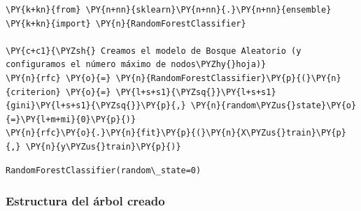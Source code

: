     \begin{tcolorbox}[breakable, size=fbox, boxrule=1pt, pad at break*=1mm,colback=cellbackground, colframe=cellborder]
\begin{Verbatim}[commandchars=\\\{\}]
\PY{k+kn}{from} \PY{n+nn}{sklearn}\PY{n+nn}{.}\PY{n+nn}{ensemble} \PY{k+kn}{import} \PY{n}{RandomForestClassifier}

\PY{c+c1}{\PYZsh{} Creamos el modelo de Bosque Aleatorio (y configuramos el número máximo de nodos\PYZhy{}hoja)}
\PY{n}{rfc} \PY{o}{=} \PY{n}{RandomForestClassifier}\PY{p}{(}\PY{n}{criterion} \PY{o}{=} \PY{l+s+s1}{\PYZsq{}}\PY{l+s+s1}{gini}\PY{l+s+s1}{\PYZsq{}}\PY{p}{,} \PY{n}{random\PYZus{}state}\PY{o}{=}\PY{l+m+mi}{0}\PY{p}{)}
\PY{n}{rfc}\PY{o}{.}\PY{n}{fit}\PY{p}{(}\PY{n}{X\PYZus{}train}\PY{p}{,} \PY{n}{y\PYZus{}train}\PY{p}{)}
\end{Verbatim}
\end{tcolorbox}

            \begin{tcolorbox}[breakable, size=fbox, boxrule=.5pt, pad at break*=1mm, opacityfill=0]
\begin{Verbatim}[commandchars=\\\{\}]
RandomForestClassifier(random\_state=0)
\end{Verbatim}
\end{tcolorbox}
        
    \hypertarget{estructura-del-uxe1rbol-creado}{%
\subsubsection{Estructura del árbol creado}\label{estructura-del-uxe1rbol-creado}}

